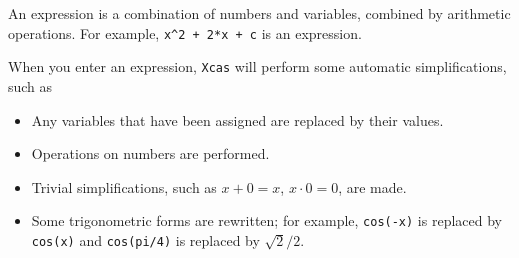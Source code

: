 \documentclass{article}
\begin{document}
An expression is a combination of numbers and variables, combined by
arithmetic operations.  For example, \texttt{x\^{}2 + 2*x + c} is an
expression. 

When you enter an expression, \texttt{Xcas} will perform some
automatic simplifications, such as
\begin{itemize}
  \item
  Any variables that have been assigned are replaced by their values.
  \item
  Operations on numbers are performed.
  \item
  Trivial simplifications, such as $x+0=x$, $x\cdot 0 = 0$, are made.
  \item
  Some trigonometric forms are rewritten; for example, \texttt{cos(-x)} is
  replaced by \texttt{cos(x)} and \texttt{cos(pi/4)} is replaced by $\sqrt{2}/2$.
\end{itemize}
\end{document}
